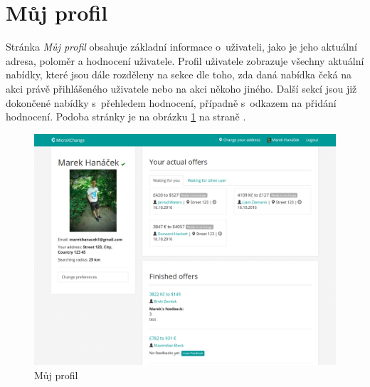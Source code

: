 \section{Můj profil}
\label{nur:my-profile}

Stránka \textit{Můj profil} obsahuje základní informace o~uživateli, jako je jeho aktuální adresa, poloměr a hodnocení uživatele.
Profil uživatele zobrazuje všechny aktuální nabídky, které jsou dále rozděleny na sekce dle toho, zda daná nabídka čeká na akci právě přihlášeného uživatele nebo na akci někoho jiného. Další sekcí jsou již dokončené nabídky s~přehledem hodnocení, případně s~odkazem na přidání hodnocení. Podoba stránky je na obrázku \ref{fig:tur:my-profile} na straně \pageref{fig:tur:my-profile}.

\begin{figure}[!h]
    \centering
    \includegraphics[width=1.0\textwidth]{media/tur/my-profile.png}
    \caption{Můj profil}
    \label{fig:tur:my-profile}
\end{figure}